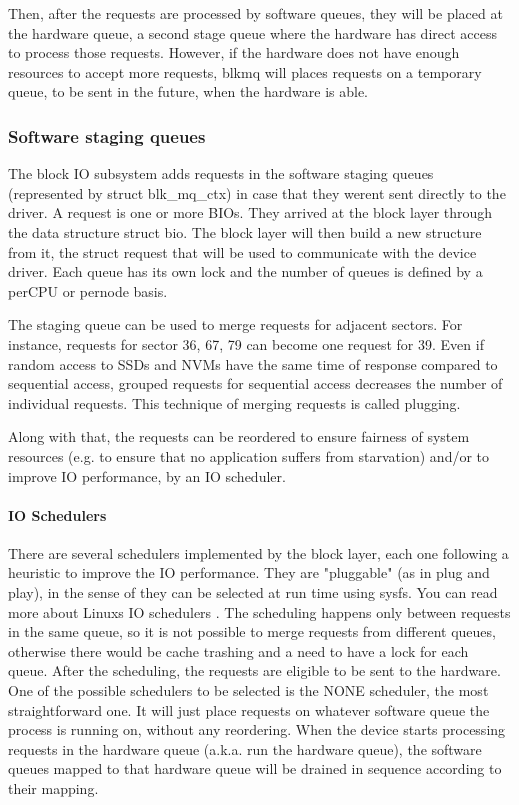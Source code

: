 \documentclass[a4paper,11pt,english]{sphinxmanual}
\begin{document}
Then, after the requests are processed by software queues, they will be placed
at the hardware queue, a second stage queue where the hardware has direct access
to process those requests. However, if the hardware does not have enough
resources to accept more requests, blk\sphinxhyphen{}mq will places requests on a temporary
queue, to be sent in the future, when the hardware is able.


\subsubsection{Software staging queues}
\label{\detokenize{blk-mq:software-staging-queues}}
The block IO subsystem adds requests in the software staging queues
(represented by struct blk\_mq\_ctx) in case that they weren\textquotesingle{}t sent
directly to the driver. A request is one or more BIOs. They arrived at the
block layer through the data structure struct bio. The block layer
will then build a new structure from it, the struct request that will
be used to communicate with the device driver. Each queue has its own lock and
the number of queues is defined by a per\sphinxhyphen{}CPU or per\sphinxhyphen{}node basis.

The staging queue can be used to merge requests for adjacent sectors. For
instance, requests for sector 3\sphinxhyphen{}6, 6\sphinxhyphen{}7, 7\sphinxhyphen{}9 can become one request for 3\sphinxhyphen{}9.
Even if random access to SSDs and NVMs have the same time of response compared
to sequential access, grouped requests for sequential access decreases the
number of individual requests. This technique of merging requests is called
plugging.

Along with that, the requests can be reordered to ensure fairness of system
resources (e.g. to ensure that no application suffers from starvation) and/or to
improve IO performance, by an IO scheduler.


\paragraph{IO Schedulers}
\label{\detokenize{blk-mq:io-schedulers}}
There are several schedulers implemented by the block layer, each one following
a heuristic to improve the IO performance. They are "pluggable" (as in plug
and play), in the sense of they can be selected at run time using sysfs. You
can read more about Linux\textquotesingle{}s IO schedulers . The scheduling
happens only between requests in the same queue, so it is not possible to merge
requests from different queues, otherwise there would be cache trashing and a
need to have a lock for each queue. After the scheduling, the requests are
eligible to be sent to the hardware. One of the possible schedulers to be
selected is the NONE scheduler, the most straightforward one. It will just
place requests on whatever software queue the process is running on, without
any reordering. When the device starts processing requests in the hardware
queue (a.k.a. run the hardware queue), the software queues mapped to that
hardware queue will be drained in sequence according to their mapping.
\end{document}
